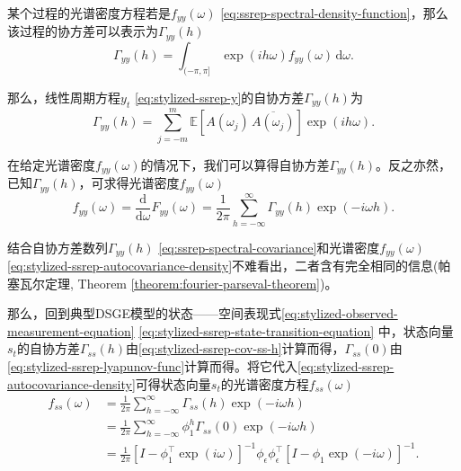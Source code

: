 某个过程的光谱密度方程若是$f_{yy} \left( \omega \right)$ \eqref{eq:ssrep-spectral-density-function}，那么该过程的协方差可以表示为$\Gamma_{yy} \left( h \right)$
\begin{equation}
  \label{eq:ssrep-spectral-covariance}
  \Gamma_{yy} \left( h \right) = \int_{(- \pi, \pi ]}
  \exp \left( i h \omega \right)
  f_{yy} \left( \omega \right) \, \mathrm{d} \omega.
\end{equation}

那么，线性周期方程$y_{t}$ \eqref{eq:stylized-ssrep-y}的自协方差$\Gamma_{yy} \left( h \right)$为
\begin{equation}
  \label{eq:stylized-ssrep-y-autocovariance}
  \Gamma_{yy} \left( h \right)
  = \sum_{j=-m}^{m} \mathbb{E} \left[ A \left( \omega_{j} \right) \, \overline{A \left( \omega_{j} \right)} \right] \exp \left( i h \omega \right).
\end{equation}

在给定光谱密度$f_{yy} \left( \omega \right)$的情况下，我们可以算得自协方差$\Gamma_{yy} \left( h \right)$。反之亦然，已知$\Gamma_{yy} \left( h \right)$，可求得光谱密度$f_{yy} \left( \omega \right)$
\begin{equation}
  \label{eq:stylized-ssrep-autocovariance-density}
  f_{yy} \left( \omega \right) = \frac{\mathrm{d}}{\mathrm{d} \omega} F_{yy} \left( \omega \right) = \frac{1}{2 \pi} \sum_{h=-\infty}^{\infty} \Gamma_{yy} \left( h \right) \exp \left( - i \omega h \right).
\end{equation}

结合自协方差数列$\Gamma_{yy} \left( h \right)$ \eqref{eq:ssrep-spectral-covariance}和光谱密度$f_{yy} \left( \omega \right)$ \eqref{eq:stylized-ssrep-autocovariance-density}不难看出，二者含有完全相同的信息(帕塞瓦尔定理, Theorem \ref{theorem:fourier-parseval-theorem})。

那么，回到典型DSGE模型的状态——空间表现式\eqref{eq:stylized-observed-measurement-equation} \eqref{eq:stylized-ssrep-state-transition-equation}
中，状态向量$s_{t}$的自协方差$\Gamma_{ss} \left( h \right)$由\eqref{eq:stylized-ssrep-cov-ss-h}计算而得，$\Gamma_{ss}\left( 0 \right)$由\eqref{eq:stylized-ssrep-lyapunov-func}计算而得。将它代入\eqref{eq:stylized-ssrep-autocovariance-density}可得状态向量$s_{t}$的光谱密度方程$f_{ss} \left( \omega \right)$
\begin{equation}
  \label{eq:stylized-ssrep-autocovariance-density-ss}
  \begin{split}
    f_{ss} \left( \omega \right)
    & = \frac{1}{2\pi} \sum_{h=-\infty}^{\infty} \Gamma_{ss} \left( h \right) \exp \left( - i \omega h \right) \\
    & = \frac{1}{2 \pi} \sum_{h=-\infty}^{\infty} \phi_{1}^{h} \Gamma_{ss} \left( 0 \right) \exp \left( - i \omega h \right) \\
    & = \frac{1}{2 \pi}
    \left[
    I - \phi_{1}^{\top} \exp \left( i \omega \right)
    \right]^{-1}
    \phi_{\epsilon} \phi_{\epsilon}^{\top}
    \left[
    I - \phi_{1} \exp \left( - i \omega \right)
    \right]^{-1}.
  \end{split}
\end{equation}

